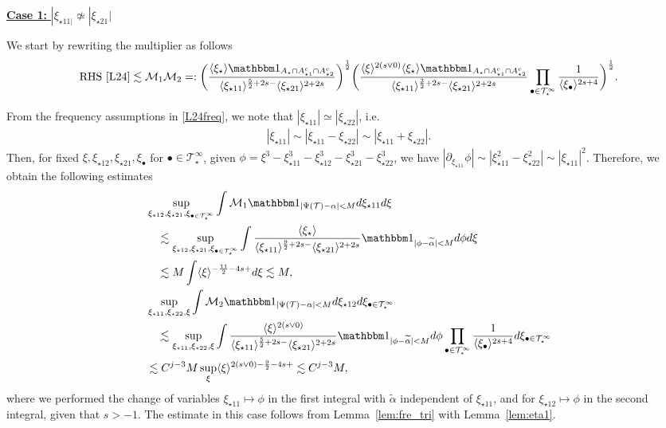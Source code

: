 \documentclass[%
11pt,  reqno]{amsart}
\newcommand{\5}{\textup{V}}
\newcommand{\noi}{\noindent}
\newcommand{\ind}{\mathbbm 1}
\newcommand{\les}{\lesssim}
\newcommand{\wt}{\widetilde}
\theoremstyle{remark}
\newcommand{\bul}{\bullet}
\newcommand{\TT}{\mathcal{T}}
\newcommand{\al}{\alpha}
\newcommand{\jb}[1]
{\langle #1 \rangle}
\newcommand{\M}{\mathcal{M}}
\numberwithin{equation}{section}
\numberwithin{theorem}{section}
\begin{document}
\smallskip
\noi
\underline{\textbf{Case 1:} $|\xi_{\star11|} \not\simeq |\xi_{\star21}|$}

We start by rewriting the multiplier as follows
\begin{align}
\text{RHS \eqref{L24}}
\les 
\M_1 \M_2
=: \bigg( \frac{\jb{\xi_\star}
\ind_{A_\star \cap A^c_{\star1} \cap A^c_{\star2}}
}{\jb{\xi_{\star11}}^{\frac52+2s-} \jb{\xi_{\star21}}^{2+2s}}  \bigg)^\frac12 
\bigg(
\frac{
\jb{\xi}^{2(s\lor0)}
\jb{\xi_\star}
\ind_{A_\star \cap A^c_{\star1} \cap A^c_{\star2}}
}{
\jb{\xi_{\star11}}^{\frac32+2s-}
\jb{\xi_{\star21}}^{2+2s}
}
\prod_{\bul\in \TT^\infty_\star} \frac{1}{\jb{\xi_\bul}^{2s+4}}
\bigg)^\frac12.
\end{align}

\noi
From the frequency assumptions in \eqref{L24freq}, we note that $|\xi_{\star11}| \simeq |\xi_{\star22}|$, i.e.
\begin{align}
|\xi_{\star11}| \sim |\xi_{\star11} - \xi_{\star22}| \sim |\xi_{\star11} + \xi_{\star22}|.  
\end{align}
Then, for fixed $\xi, \xi_{\star12}, \xi_{\star21}, \xi_\bul$ for $\bul\in \TT^\infty_\star$, given $\phi = \xi^3 - \xi_{\star11}^3 - \xi_{\star12}^3 - \xi_{\star21}^3 - \xi_{\star22}^3$, we have $|\partial_{\xi_{\star11}} \phi | \sim  |\xi_{\star11}^2 - \xi_{\star22}^2| \sim |\xi_{\star11}|^2$. Therefore, we obtain the following estimates
\begin{align}
& 
\sup_{\xi_{\star12}, \xi_{\star21}, \xi_{\bul\in \TT^\infty_\star}}
\int \M_1 \ind_{|\Psi(\TT) - \al| < M } d\xi_{\star11} d\xi 
\\
&
\quad 
\les 
\sup_{\xi_{\star12}, \xi_{\star21}, \xi_{\bul\in \TT^\infty_\star}}
\int 
\frac{\jb{\xi_\star} }{ \jb{\xi_{\star11}}^{\frac92 + 2s-} \jb{\xi_{\star21}}^{2+2s} } \ind_{|\phi - \wt\al| < M } d\phi d\xi 
\\
&
\quad 
\les M \int \jb{\xi}^{-\frac{11}{2} - 4s + } d\xi \les M, 
\\
&
\sup_{\xi_{\star11}, \xi_{\star22}, \xi} 
\int \M_2  \ind_{|\Psi(\TT) - \al| < M} 
d \xi_{\star12} 
d\xi_{\bul \in \TT^\infty_\star}
\\
&
\quad 
\les 
\sup_{\xi_{\star11}, \xi_{\star22}, \xi} 
\int 
\frac{ \jb{\xi}^{2(s\lor0)}  }{ \jb{\xi_{\star11}}^{\frac52 + 2s -} \jb{\xi_{\star21}}^{2+2s} } \ind_{|\phi - \wt\al| < M} d\phi 
\prod_{\bul\in \TT^\infty_\star} \frac{1}{\jb{\xi_\bul}^{2s+4}}
d\xi_{\bul \in \TT^\infty_\star}
\\
&
\les C^{j-3} M  \sup_\xi \jb{\xi}^{2(s\lor 0) - \frac92 - 4s + } \les C^{j-3} M 
, 
\end{align}
where we performed the change of variables $\xi_{\star11} \mapsto \phi$ in the first integral with $\wt\al$ independent of $\xi_{\star11}$, 
and for $\xi_{\star12} \mapsto \phi$ in the second integral, 
given that $s>-1$. 
The estimate in this case follows from Lemma~\ref{lem:fre_tri} with Lemma~\ref{lem:eta1}. 
\end{document}
